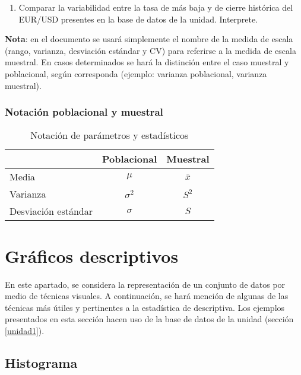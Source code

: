 \documentclass[
]{book}
\providecommand{\tightlist}{%
  \setlength{\itemsep}{0pt}\setlength{\parskip}{0pt}}
\begin{document}
\begin{enumerate}
\def\labelenumi{\arabic{enumi}.}
\tightlist
\item
  Comparar la variabilidad entre la tasa de más baja y de cierre histórica del EUR/USD presentes en la base de datos de la unidad. Interprete.
\end{enumerate}

\textbf{Nota}: en el documento se usará simplemente el nombre de la medida de escala (rango, varianza, desviación estándar y CV) para referirse a la medida de escala muestral. En casos determinados se hará la distinción entre el caso muestral y poblacional, según corresponda (ejemplo: varianza poblacional, varianza muestral).

\hypertarget{notaciuxf3n-poblacional-y-muestral}{%
\subsubsection*{Notación poblacional y muestral}\label{notaciuxf3n-poblacional-y-muestral}}

\begin{table}

\caption{\label{tab:notacion}Notación de parámetros y estadísticos}
\centering
\begin{tabular}[t]{lcc}
\toprule
  & Poblacional & Muestral\\
\midrule
Media & $\mu$ & $\bar{x}$\\
Varianza & $\sigma^2$ & $S^2$\\
Desviación estándar & $\sigma$ & $S$\\
\bottomrule
\end{tabular}
\end{table}

\hypertarget{gruxe1ficos-descriptivos}{%
\section{Gráficos descriptivos}\label{gruxe1ficos-descriptivos}}

En este apartado, se considera la representación de un conjunto de datos por medio de técnicas visuales. A continuación, se hará mención de algunas de las técnicas más útiles y pertinentes a la estadística de descriptiva. Los ejemplos presentados en esta sección hacen uso de la base de datos de la unidad (sección \ref{unidad1}).

\hypertarget{histograma}{%
\subsection{Histograma}\label{histograma}}
\end{document}
